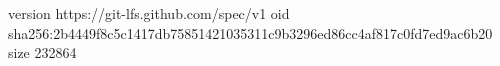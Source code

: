 version https://git-lfs.github.com/spec/v1
oid sha256:2b4449f8c5c1417db75851421035311c9b3296ed86cc4af817c0fd7ed9ac6b20
size 232864
